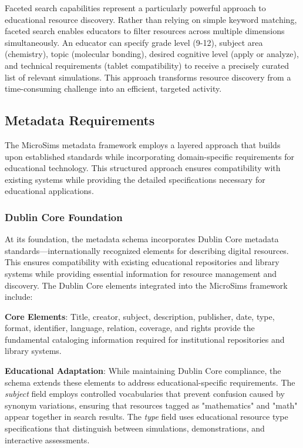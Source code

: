 Faceted search capabilities represent a particularly powerful approach to educational resource discovery. Rather than relying on simple keyword matching, faceted search enables educators to filter resources across multiple dimensions simultaneously. An educator can specify grade level (9-12), subject area (chemistry), topic (molecular bonding), desired cognitive level (apply or analyze), and technical requirements (tablet compatibility) to receive a precisely curated list of relevant simulations. This approach transforms resource discovery from a time-consuming challenge into an efficient, targeted activity.

\subsection{Metadata Requirements}

The MicroSims metadata framework employs a layered approach that builds upon established standards while incorporating domain-specific requirements for educational technology. This structured approach ensures compatibility with existing systems while providing the detailed specifications necessary for educational applications.

\subsubsection{Dublin Core Foundation}

At its foundation, the metadata schema incorporates Dublin Core metadata standards—internationally recognized elements for describing digital resources. This ensures compatibility with existing educational repositories and library systems while providing essential information for resource management and discovery. The Dublin Core elements integrated into the MicroSims framework include:

\textbf{Core Elements}: Title, creator, subject, description, publisher, date, type, format, identifier, language, relation, coverage, and rights provide the fundamental cataloging information required for institutional repositories and library systems.

\textbf{Educational Adaptation}: While maintaining Dublin Core compliance, the schema extends these elements to address educational-specific requirements. The \textit{subject} field employs controlled vocabularies that prevent confusion caused by synonym variations, ensuring that resources tagged as "mathematics" and "math" appear together in search results. The \textit{type} field uses educational resource type specifications that distinguish between simulations, demonstrations, and interactive assessments.

